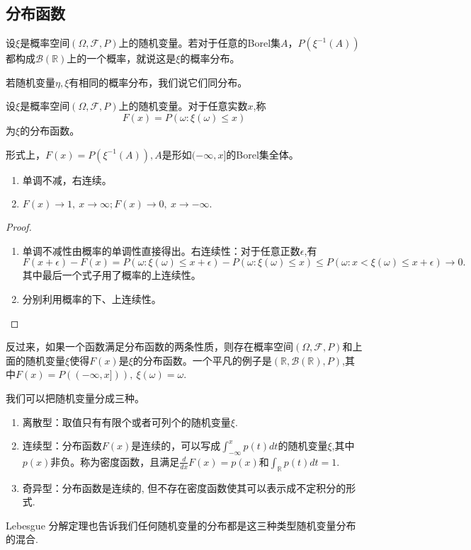 \documentclass[lang=cn,10pt]{elegantbook}
\begin{document}
	\subsection{分布函数}
	\begin{definition}[概率分布]
		设\(\xi\)是概率空间\((\Omega,\mathcal{F},P)\)上的随机变量。若对于任意的Borel集\(A\)，\(P(\xi^{-1}(A))\)都构成\(\mathcal{B}(\mathbb{R})\)上的一个概率，就说这是\(\xi\)的概率分布。
		
		若随机变量\(\eta,\xi\)有相同的概率分布，我们说它们同分布。
	\end{definition}
	\begin{definition}[分布函数]
		设\(\xi\)是概率空间\((\Omega,\mathcal{F},P)\)上的随机变量。对于任意实数\(x\),称
		\[F(x)=P(\omega:\xi(\omega)\le x)\]
		为\(\xi\)的分布函数。
		
		形式上，\(F(x)=P(\xi^{-1}(A)),A\)是形如\((-\infty,x]\)的Borel集全体。
	\end{definition}
	\begin{property}
		\begin{enumerate}
			\item 单调不减，右连续。
			\item \(F(x)\to 1,\ x\to \infty;F(x)\to 0,\ x\to -\infty.\)
		\end{enumerate}
	\end{property}
	\begin{proof}
		\begin{enumerate}
			\item 单调不减性由概率的单调性直接得出。右连续性：对于任意正数\(\epsilon\),有\(F(x+\epsilon)-F(x)=P(\omega:\xi(\omega)\le x+\epsilon)-P(\omega:\xi(\omega)\le x)\le P(\omega:x<\xi(\omega)\le x+\epsilon)\to 0.\)其中最后一个式子用了概率的上连续性。
			\item 分别利用概率的下、上连续性。
		\end{enumerate}
	\end{proof}
反过来，如果一个函数满足分布函数的两条性质，则存在概率空间\((\Omega,\mathcal{F},P)\)和上面的随机变量\(\xi\)使得\(F(x)\)是\(\xi\)的分布函数。一个平凡的例子是\((\mathbb{R},\mathcal{B}(\mathbb{R}),P)\),其中\(F(x)=P((-\infty,x])),\ \xi(\omega)=\omega.\)

我们可以把随机变量分成三种。
\begin{enumerate}
	\item 离散型：取值只有有限个或者可列个的随机变量\(\xi\).
	\item 连续型：分布函数\(F(x)\)是连续的，可以写成\(\int_{-\infty}^x p(t)dt\)的随机变量\(\xi\),其中\(p(x)\)非负。称为密度函数，且满足\(\frac{d}{dx}F(x)=p(x)\)和\(\int_\mathbb{R}p(t)dt=1\).
	\item 奇异型：分布函数是连续的, 但不存在密度函数使其可以表示成不定积分的形式. 
\end{enumerate}
Lebesgue 分解定理也告诉我们任何随机变量的分布都是这三种类型随机变量分布的混合.
\end{document}
